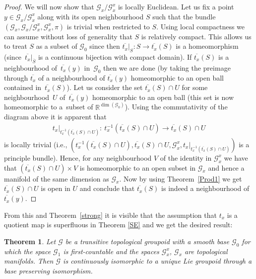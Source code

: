 \documentclass[11pt]{article}
\newtheorem{tw}{Theorem}[section]
\begin{document}
\begin{proof}
We will now show that $\mathcal{G}_x\slash\mathcal{G}_x^x$ is locally Euclidean. Let us fix a point $y\in\mathcal{G}_x\slash\mathcal{G}_x^x$ along with its open neighbourhood $S$ such that the bundle $(\mathcal{G}_x,\mathcal{G}_x\slash\mathcal{G}_x^x,\mathcal{G}_x^x,\pi)$ is trivial when restricted to $S$. Using local compactness we can assume without loss of generality that $S$ is relatively compact. This allows us to treat $S$ as a subset of $\mathcal{G}_0$ since then $\overline{t_x}|_S\colon S\rightarrow\overline{t_x}(S)$ is a homeomorphism (since~$\overline{t_x}|_{\overline{S}}$ is a continuous bijection with compact domain). If $\overline{t_x}(S)$ is a neighbourhood of~$\overline{t_x}(y)$ in~$\mathcal{G}_0$ then we are done (by taking the preimage through $\overline{t_x}$ of a neighbourhood of $\overline{t_x}(y)$ homeomorphic to an open ball contained in~$\overline{t_x}(S)$). Let us consider the set $\overline{t_x}(S)\cap U$ for some neighbourhood~$U$ of~$\overline{t_x}(y)$ homeomorphic to an open ball (this set is now homeomorphic to a~subset of $\mathbb{R}^{\dim(\mathcal{G}_0)}$). Using the commutativity of the diagram above it is apparent that
\begin{gather*}
t_x|_{t_x^{-1}(\overline{t_x}(S)\cap U)}\colon \ t_x^{-1}(\overline{t_x}(S)\cap U)\rightarrow \overline{t_x}(S)\cap U
\end{gather*}
is locally trivial (i.e., $(t_x^{-1}(\overline{t_x}(S)\cap U),\overline{t_x}(S)\cap U,\mathcal{G}^x_x,t_x|_{t_x^{-1}(\overline{t_x}(S)\cap U)})$ is a principle bundle). Hence, for any neighbourhood $V$ of the identity in $\mathcal{G}^x_x$ we have that $(\overline{t_x}(S)\cap U)\times V$ is homeomorphic to an open subset in $\mathcal{G}_x$ and hence a manifold of the same dimension as $\mathcal{G}_x$. Now by using Theorem~\ref{Prod1} we get $\overline{t_x}(S)\cap U$ is open in $U$ and conclude that $\overline{t_x}(S)$ is indeed a neighbourhood of $\overline{t_x}(y)$.
\end{proof}

From this and Theorem~\ref{strong} it is visible that the assumption that $t_x$ is a quotient map is superfluous in Theorem \ref{SE} and we get the desired result:
\begin{tw}\label{H5S} Let $\mathcal{G}$ be a transitive topological groupoid with a smooth base $\mathcal{G}_0$ for which the space $\mathcal{G}_1$ is first-countable and the spaces $\mathcal{G}_x^x$, $\mathcal{G}_x$ are topological manifolds. Then $\mathcal{G}$ is continuously isomorphic to a unique Lie groupoid through a base preserving isomorphism.
\end{tw}
\end{document}
